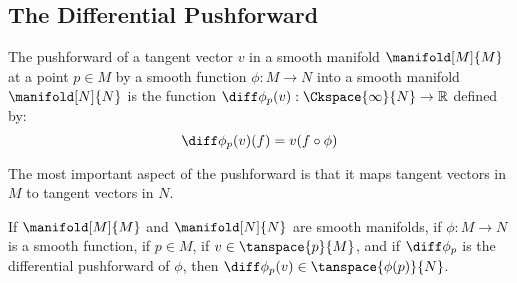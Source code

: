\documentclass{article}                                                        %
\begin{document}
        \subsection{The Differential Pushforward}
            \begin{definition}
                The pushforward of a tangent vector $v$ in a smooth manifold
                $\manifold[M]{M}$ at a point $p\in{M}$ by a smooth function
                $\phi:M\rightarrow{N}$ into a smooth manifold $\manifold[N]{N}$
                is the function
                $\diff\phi_{p}(v):\Ckspace{\infty}{N}\rightarrow\mathbb{R}$
                defined by:
                \begin{equation}
                    \diff\phi_{p}(v)(f)=v(f\circ\phi)
                \end{equation}
            \end{definition}
            The most important aspect of the pushforward is that it maps tangent
            vectors in $M$ to tangent vectors in $N$.
            \begin{theorem}
                If $\manifold[M]{M}$ and $\manifold[N]{N}$ are smooth manifolds,
                if $\phi:M\rightarrow{N}$ is a smooth function, if $p\in{M}$,
                if $v\in\tanspace{p}{M}$, and if $\diff\phi_{p}$ is the
                differential pushforward of $\phi$, then
                $\diff\phi_{p}(v)\in\tanspace{\phi(p)}{N}$.
            \end{theorem}
\end{document}

